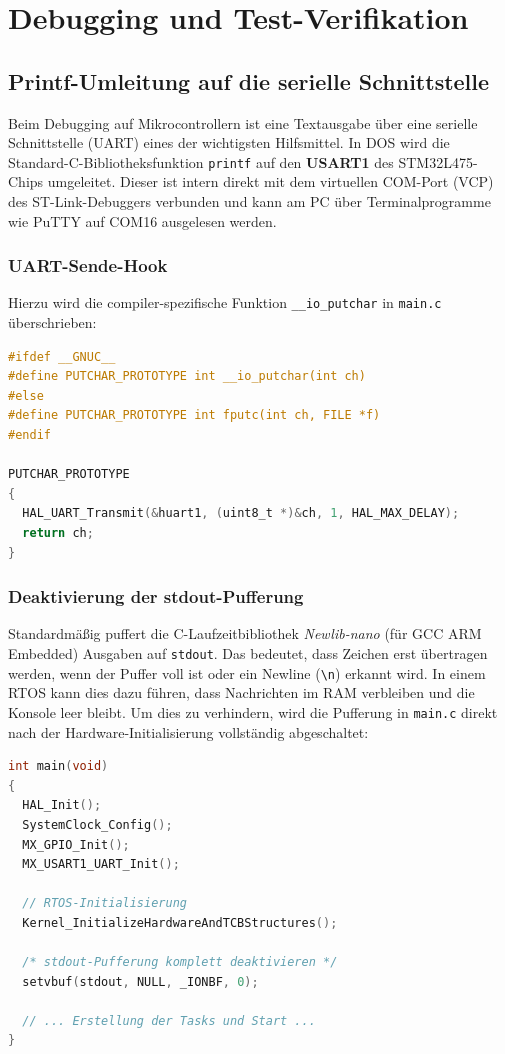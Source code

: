 \chapter{Debugging und Test-Verifikation}
\label{ch:debugging_tests}

\section{Printf-Umleitung auf die serielle Schnittstelle}
Beim Debugging auf Mikrocontrollern ist eine Textausgabe über eine serielle Schnittstelle (UART) eines der wichtigsten Hilfsmittel. In DOS wird die Standard-C-Bibliotheksfunktion \lstinline|printf| auf den \textbf{USART1} des STM32L475-Chips umgeleitet. Dieser ist intern direkt mit dem virtuellen COM-Port (VCP) des ST-Link-Debuggers verbunden und kann am PC über Terminalprogramme wie PuTTY auf COM16 ausgelesen werden.

\subsection{UART-Sende-Hook}
Hierzu wird die compiler-spezifische Funktion \lstinline|__io_putchar| in \lstinline|main.c| überschrieben:

\begin{lstlisting}[language=C, caption={Umleitung von stdout auf USART1 in main.c}, label={lst:printf_redirect}]
#ifdef __GNUC__
#define PUTCHAR_PROTOTYPE int __io_putchar(int ch)
#else
#define PUTCHAR_PROTOTYPE int fputc(int ch, FILE *f)
#endif

PUTCHAR_PROTOTYPE
{
  HAL_UART_Transmit(&huart1, (uint8_t *)&ch, 1, HAL_MAX_DELAY);
  return ch;
}
\end{lstlisting}

\subsection{Deaktivierung der stdout-Pufferung}
Standardmäßig puffert die C-Laufzeitbibliothek \textit{Newlib-nano} (für GCC ARM Embedded) Ausgaben auf \lstinline|stdout|. Das bedeutet, dass Zeichen erst übertragen werden, wenn der Puffer voll ist oder ein Newline (\lstinline|\n|) erkannt wird. In einem RTOS kann dies dazu führen, dass Nachrichten im RAM verbleiben und die Konsole leer bleibt.
Um dies zu verhindern, wird die Pufferung in \lstinline|main.c| direkt nach der Hardware-Initialisierung vollständig abgeschaltet:

\begin{lstlisting}[language=C, caption={Deaktivierung der stdout-Pufferung}, label={lst:setvbuf}]
int main(void)
{
  HAL_Init();
  SystemClock_Config();
  MX_GPIO_Init();
  MX_USART1_UART_Init();
  
  // RTOS-Initialisierung
  Kernel_InitializeHardwareAndTCBStructures();

  /* stdout-Pufferung komplett deaktivieren */
  setvbuf(stdout, NULL, _IONBF, 0);

  // ... Erstellung der Tasks und Start ...
}
\end{lstlisting}

